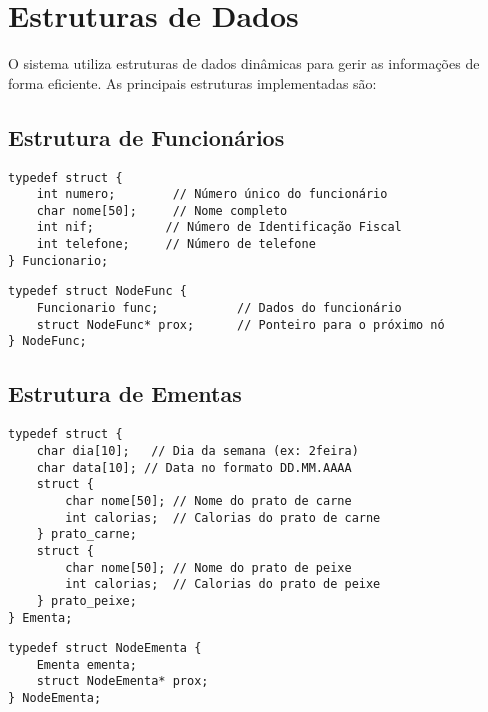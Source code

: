 \documentclass[a4paper,12pt]{report}
\begin{document}
\section{Estruturas de Dados}
O sistema utiliza estruturas de dados dinâmicas para gerir as informações de forma eficiente. As principais estruturas implementadas são:

\subsection{Estrutura de Funcionários}
\begin{lstlisting}[caption={Estrutura de dados para Funcionários},label=lst:funcionario]
typedef struct {
    int numero;        // Número único do funcionário
    char nome[50];     // Nome completo
    int nif;          // Número de Identificação Fiscal
    int telefone;     // Número de telefone
} Funcionario;
\end{lstlisting}
\begin{lstlisting}[caption={Estrutura do Nó da Lista de Funcionários},label=lst:noFuncionario]
typedef struct NodeFunc {
    Funcionario func;           // Dados do funcionário
    struct NodeFunc* prox;      // Ponteiro para o próximo nó
} NodeFunc;
\end{lstlisting}

\subsection{Estrutura de Ementas}
\begin{lstlisting}[caption={Estrutura de dados para Ementas},label=lst:ementa]
typedef struct {
    char dia[10];   // Dia da semana (ex: 2feira)
    char data[10]; // Data no formato DD.MM.AAAA
    struct {
        char nome[50]; // Nome do prato de carne
        int calorias;  // Calorias do prato de carne
    } prato_carne;
    struct {
        char nome[50]; // Nome do prato de peixe
        int calorias;  // Calorias do prato de peixe
    } prato_peixe;
} Ementa;
\end{lstlisting}
\begin{lstlisting}[caption={Estrutura do Nó da Lista de Ementas},label=lst:noEmenta]
typedef struct NodeEmenta {
    Ementa ementa;
    struct NodeEmenta* prox;
} NodeEmenta;
\end{lstlisting}
\end{document}
